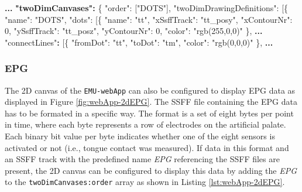 \documentclass[]{book}
\newenvironment{Shaded}{\begin{snugshade}}{\end{snugshade}}
\newcommand{\DataTypeTok}[1]{\textcolor[rgb]{0.13,0.29,0.53}{#1}}
\newcommand{\DecValTok}[1]{\textcolor[rgb]{0.00,0.00,0.81}{#1}}
\newcommand{\ErrorTok}[1]{\textcolor[rgb]{0.64,0.00,0.00}{\textbf{#1}}}
\newcommand{\FunctionTok}[1]{\textcolor[rgb]{0.00,0.00,0.00}{#1}}
\newcommand{\OtherTok}[1]{\textcolor[rgb]{0.56,0.35,0.01}{#1}}
\newcommand{\StringTok}[1]{\textcolor[rgb]{0.31,0.60,0.02}{#1}}
\begin{document}
\begin{Shaded}
\begin{Highlighting}[]
\ErrorTok{...}
\ErrorTok{"twoDimCanvases":} \FunctionTok{\{}
    \DataTypeTok{"order"}\FunctionTok{:} \OtherTok{[}\StringTok{"DOTS"}\OtherTok{]}\FunctionTok{,}
    \DataTypeTok{"twoDimDrawingDefinitions"}\FunctionTok{:} \OtherTok{[}\FunctionTok{\{}
        \DataTypeTok{"name"}\FunctionTok{:} \StringTok{"DOTS"}\FunctionTok{,}
        \DataTypeTok{"dots"}\FunctionTok{:} \OtherTok{[}\FunctionTok{\{}
            \DataTypeTok{"name"}\FunctionTok{:} \StringTok{"tt"}\FunctionTok{,}
            \DataTypeTok{"xSsffTrack"}\FunctionTok{:} \StringTok{"tt_posy"}\FunctionTok{,}
            \DataTypeTok{"xContourNr"}\FunctionTok{:} \DecValTok{0}\FunctionTok{,}
            \DataTypeTok{"ySsffTrack"}\FunctionTok{:} \StringTok{"tt_posz"}\FunctionTok{,}
            \DataTypeTok{"yContourNr"}\FunctionTok{:} \DecValTok{0}\FunctionTok{,}
            \DataTypeTok{"color"}\FunctionTok{:} \StringTok{"rgb(255,0,0)"}
        \FunctionTok{\}}\OtherTok{,}
\ErrorTok{...}
    \StringTok{"connectLines"}\ErrorTok{:} \OtherTok{[}\FunctionTok{\{}
        \DataTypeTok{"fromDot"}\FunctionTok{:} \StringTok{"tt"}\FunctionTok{,}
        \DataTypeTok{"toDot"}\FunctionTok{:} \StringTok{"tm"}\FunctionTok{,}
            \DataTypeTok{"color"}\FunctionTok{:} \StringTok{"rgb(0,0,0)"}
    \FunctionTok{\}}\OtherTok{,}
\ErrorTok{...}
\end{Highlighting}
\end{Shaded}

\hypertarget{epg}{%
\subsubsection{EPG}\label{epg}}

The 2D canvas of the \texttt{EMU-webApp} can also be configured to display EPG data as displayed in Figure \ref{fig:webApp-2dEPG}. The SSFF file containing the EPG data has to be formated in a specific way. The format is a set of eight bytes per point in time, where each byte represents a row of electrodes on the artificial palate. Each binary bit value per byte indicates whether one of the eight sensors is activated or not (i.e., tongue contact was measured). If data in this format and an SSFF track with the predefined name \emph{EPG} referencing the SSFF files are present, the 2D canvas can be configured to display this data by adding the \emph{EPG} to the \texttt{twoDimCanvases:order} array as shown in Listing \ref{lst:webApp-2dEPG}.
\end{document}
